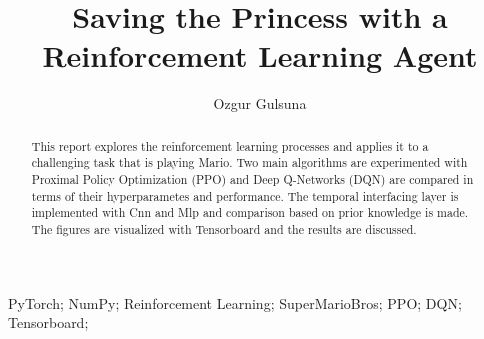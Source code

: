 \documentclass[3p,times,procedia]{elsarticle}
\begin{document}
\begin{frontmatter}





\title{\textbf{Saving the Princess with a \\ Reinforcement Learning Agent}}




\author[]{Ozgur Gulsuna} 

\address[]{Middle East Technical University, Electrical and Electronics Engineering, Ankara, Turkey}

\begin{abstract}
This report explores the reinforcement learning processes and applies it to a challenging task that is playing Mario. Two main algorithms are experimented with
Proximal Policy Optimization (PPO) and Deep Q-Networks (DQN) are compared in terms of their hyperparametes and performance.
The temporal interfacing layer is implemented with Cnn and Mlp and comparison based on prior knowledge is made.
The figures are visualized with Tensorboard and the results are discussed.
\end{abstract}

\begin{keyword}
PyTorch;
 NumPy;
 Reinforcement Learning;
 SuperMarioBros;
 PPO;
 DQN;
 Tensorboard;
\end{keyword}

\end{frontmatter}
\end{document}
